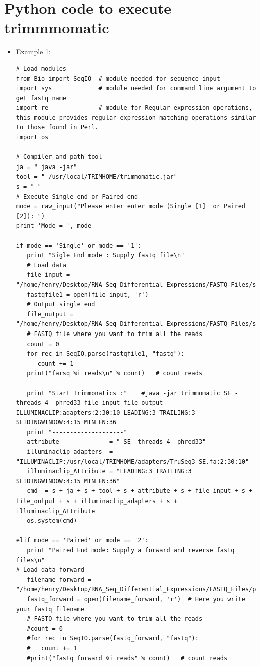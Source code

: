 \documentclass{article}
\begin{document}
\section{Python code to execute trimmmomatic}
\begin{itemize}
\item Example 1:
\tiny  
\begin{verbatim}
# Load modules
from Bio import SeqIO  # module needed for sequence input  
import sys             # module needed for command line argument to get fastq name  
import re              # module for Regular expression operations, this module provides regular expression matching operations similar to those found in Perl.
import os

# Compiler and path tool
ja = " java -jar"
tool = " /usr/local/TRIMHOME/trimmomatic.jar"
s = " "
# Execute Single end or Paired end
mode = raw_input("Please enter enter mode (Single [1]  or Paired [2]): ")
print 'Mode = ', mode

if mode == 'Single' or mode == '1':  
   print "Sigle End mode : Supply fastq file\n"
   # Load data 
   file_input = "/home/henry/Desktop/RNA_Seq_Differential_Expressions/FASTQ_Files/single_end/ERR458493.fastq"
   fastqfile1 = open(file_input, 'r') 
   # Output single end
   file_output = "/home/henry/Desktop/RNA_Seq_Differential_Expressions/FASTQ_Files/single_end/output_single_ERR458493.fastq"
   # FASTQ file where you want to trim all the reads
   count = 0
   for rec in SeqIO.parse(fastqfile1, "fastq"):
      count += 1
   print("farsq %i reads\n" % count)   # count reads

   print "Start Trimmonatics :"    #java -jar trimmomatic SE -threads 4 -phred33 file_input file_output ILLUMINACLIP:adapters:2:30:10 LEADING:3 TRAILING:3 SLIDINGWINDOW:4:15 MINLEN:36
   print "--------------------" 
   attribute              = " SE -threads 4 -phred33"
   illuminaclip_adapters  = "ILLUMINACLIP:/usr/local/TRIMHOME/adapters/TruSeq3-SE.fa:2:30:10"
   illuminaclip_Attribute = "LEADING:3 TRAILING:3 SLIDINGWINDOW:4:15 MINLEN:36"
   cmd  = s + ja + s + tool + s + attribute + s + file_input + s + file_output + s + illuminaclip_adapters + s + illuminaclip_Attribute
   os.system(cmd)

elif mode == 'Paired' or mode == '2': 
   print "Paired End mode: Supply a forward and reverse fastq files\n"
# Load data forward
   filename_forward = "/home/henry/Desktop/RNA_Seq_Differential_Expressions/FASTQ_Files/paired_end/ERR950159_1.fastq"
   fastq_forward = open(filename_forward, 'r')  # Here you write your fastq filename
   # FASTQ file where you want to trim all the reads
   #count = 0
   #for rec in SeqIO.parse(fastq_forward, "fastq"):
   #   count += 1
   #print("fastq forward %i reads" % count)   # count reads


\end{verbatim}
\end{itemize}
\end{document}
